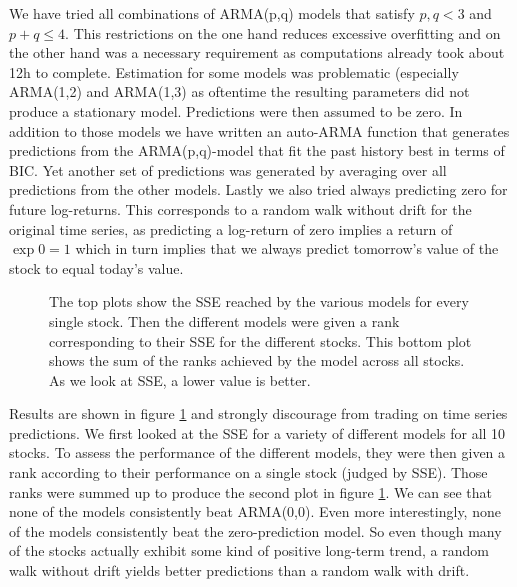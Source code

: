 We have tried all combinations of ARMA(p,q) models that satisfy $p,q < 3$ and $p+q \leq 4$. This restrictions on the one hand reduces excessive overfitting and on the other hand was a necessary requirement as computations already took about 12h to complete. Estimation for some models was problematic (especially ARMA(1,2) and ARMA(1,3) as oftentime the resulting parameters did not produce a stationary model. Predictions were then assumed to be zero. In addition to those models we have written an auto-ARMA function that generates predictions from the ARMA(p,q)-model that fit the past history best in terms of BIC. Yet another set of predictions was generated by averaging over all predictions from the other models. Lastly we also tried always predicting zero for future log-returns. This corresponds to a random walk without drift for the original time series, as predicting a log-return of zero implies a return of $\exp{0} = 1$ which in turn implies that we always predict tomorrow's value of the stock to equal today's value. 

\begin{figure}[h!]
    \centering
    \begin{adjustbox}{width = 0.95\linewidth}
    
    \end{adjustbox}
    \vspace{1ex}
    \begin{adjustbox}{width = 0.95\linewidth}
    
    \end{adjustbox}
    \caption{The top plots show the SSE reached by the various models for every single stock. Then the different models were given a rank corresponding to their SSE for the different stocks. This bottom plot shows the sum of the ranks achieved by the model across all stocks. As we look at SSE, a lower value is better.}
    \label{fig:models_ranked}
\end{figure}{}


Results are shown in figure \ref{fig:models_ranked} and strongly discourage from trading on time series predictions. We first looked at the SSE for a variety of different models for all 10 stocks. To assess the performance of the different models, they were then given a rank according to their performance on a single stock (judged by SSE). Those ranks were summed up to produce the second plot in figure \ref{fig:models_ranked}. We can see that none of the models consistently beat ARMA(0,0). Even more interestingly, none of the models consistently beat the zero-prediction model. So even though many of the stocks actually exhibit some kind of positive long-term trend, a random walk without drift yields better predictions than a random walk with drift. 



